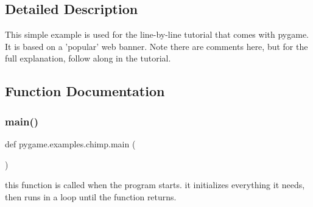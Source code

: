 \subsection{Detailed Description}
\begin{DoxyVerb}This simple example is used for the line-by-line tutorial
that comes with pygame. It is based on a 'popular' web banner.
Note there are comments here, but for the full explanation,
follow along in the tutorial.
\end{DoxyVerb}
 

\subsection{Function Documentation}
\mbox{\label{namespacepygame_1_1examples_1_1chimp_a9c5b41a34dd2dff9ce14afe12d6968f7}} 
\subsubsection{\texorpdfstring{main()}{main()}}
{\footnotesize\ttfamily def pygame.\+examples.\+chimp.\+main (\begin{DoxyParamCaption}{ }\end{DoxyParamCaption})}

\begin{DoxyVerb}this function is called when the program starts.
   it initializes everything it needs, then runs in
   a loop until the function returns.\end{DoxyVerb}
 